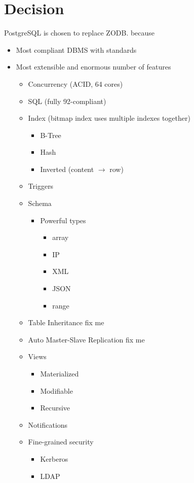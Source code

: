 \section{Decision}

PostgreSQL is chosen to replace ZODB. because
\begin{itemize}
  \item Most compliant DBMS with standards
  \item Most extensible and enormous number of features
  \begin{itemize}
    \item Concurrency (ACID, 64 cores)
	\item SQL (fully 92-compliant)
	\item Index (bitmap index uses multiple indexes together)
	\begin{itemize}
	  \item B-Tree
	  \item Hash
	  \item Inverted (content $\rightarrow$ row)
	\end{itemize}
	\item Triggers
	\item Schema
	\begin{itemize}
	  \item Powerful types
	  \begin{itemize}
	    \item array
	    \item IP
	    \item XML
	    \item JSON
	    \item range
	  \end{itemize}
	\end{itemize}
	\item Table Inheritance \textcolor{mygreen}{fix me}
	\item Auto Master-Slave Replication \textcolor{mygreen}{fix me}
	\item Views
	\begin{itemize}
	  \item Materialized
	  \item Modifiable
	  \item Recursive
	\end{itemize}
	\item Notifications
	\item Fine-grained security
	\begin{itemize}
	  \item Kerberos
	  \item LDAP

\end{itemize}
\end{itemize}
\end{itemize}
